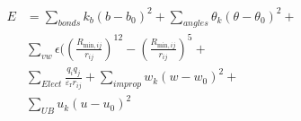\documentclass[paper=a5,fontsize=12pt]{scrbook}
\begin{document}
            \begin{preview}

            
            \begin{align*}
            E &= \sum_{bonds} k_b (b - b_0)^2 + \sum_{angles} \theta_k (\theta - \theta_0)^2 + \\
            & \sum_{vw} \epsilon(  (\frac{R_{\text{min},ij}}{r_{ij}})^{12} - (\frac{R_{\text{min},ij}}{r_{ij}})^5 + \\
            & \sum_{Elect} \frac{q_i q_j}{\varepsilon_{\text{r}} r_{ij}} + \sum_{improp} w_k (w - w_0)^2 + \\
            & \sum_{UB} u_k (u - u_0)^2
            \end{align*}
            


            \end{preview}
            
\end{document}
